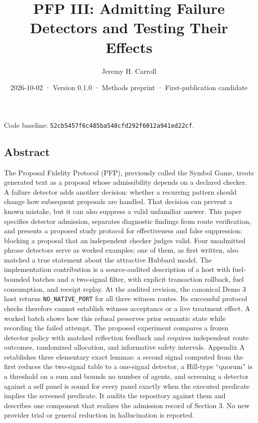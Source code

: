 \documentclass[
  11pt,
]{article}
\title{PFP III: Admitting Failure Detectors and Testing Their Effects}
\author{Jeremy H. Carroll}
\date{2026-10-02 · Version 0.1.0 · Methods preprint · First-publication candidate}
\begin{document}
\makeatletter
\begin{center}
{\LARGE \@title\par}
\vspace{0.8em}
{\normalsize \@author\par}
\vspace{0.5em}
{\small \@date\par}
\end{center}
\makeatother

Code baseline:
\texttt{\nolinkurl{52cb5457f6c485ba548cfd292f6012a941ed22cf}}.

\hypertarget{abstract}{%
\subsection{Abstract}\label{abstract}}

The Proposal Fidelity Protocol (PFP), previously called the Symbol Game,
treats generated text as a proposal whose admissibility depends on a
declared checker. A failure detector adds another decision: whether a
recurring pattern should change how subsequent proposals are handled.
That decision can prevent a known mistake, but it can also suppress a
valid unfamiliar answer. This paper specifies detector admission,
separates diagnostic findings from route verification, and presents a
proposed study protocol for effectiveness and false suppression:
blocking a proposal that an independent checker judges valid. Four
unadmitted phrase detectors serve as worked examples; one of them, as
first written, also matched a true statement about the attractive
Hubbard model. The implementation contribution is a source-audited
description of a host with fuel-bounded batches and a two-signal filter,
with explicit transaction rollback, fuel consumption, and receipt
replay. At the audited revision, the canonical Demo 3 host returns
\texttt{\nolinkurl{NO_NATIVE_PORT}} for all three witness routes.
Its successful protocol checks therefore cannot establish witness
acceptance or a live treatment effect. A worked batch shows how this
refusal preserves prior semantic state while recording the failed
attempt. The proposed experiment compares a frozen detector policy with
matched reflection feedback and requires independent route outcomes,
randomized allocation, and informative safety intervals. Appendix A
establishes three elementary exact lemmas: a second signal computed from
the first reduces the two-signal table to a one-signal detector, a
Hill-type ``quorum'' is a threshold on a sum and bounds no number of
agents, and screening a detector against a self panel is sound for every
panel exactly when the executed predicate implies the screened
predicate. It audits the repository against them and describes one
component that realizes the admission record of Section 3. No new
provider trial or general reduction in hallucination is reported.
\end{document}
